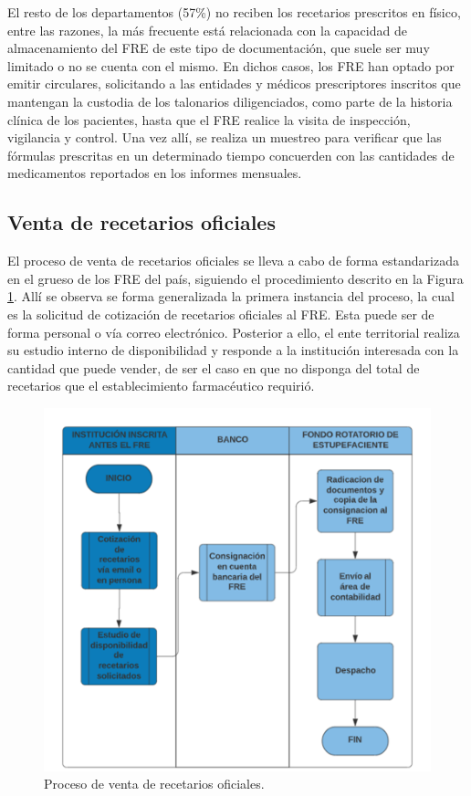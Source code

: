 \documentclass[
  oneside]{book}
\begin{document}
El resto de los departamentos (57\%) no reciben los recetarios prescritos en físico, entre las razones, la más frecuente está relacionada con la capacidad de almacenamiento del FRE de este tipo de documentación, que suele ser muy limitado o no se cuenta con el mismo. En dichos casos, los FRE han optado por emitir circulares, solicitando a las entidades y médicos prescriptores inscritos que mantengan la custodia de los talonarios diligenciados, como parte de la historia clínica de los pacientes, hasta que el FRE realice la visita de inspección, vigilancia y control. Una vez allí, se realiza un muestreo para verificar que las fórmulas prescritas en un determinado tiempo concuerden con las cantidades de medicamentos reportados en los informes mensuales.

\hypertarget{venta-de-recetarios-oficiales}{%
\subsection{Venta de recetarios oficiales}\label{venta-de-recetarios-oficiales}}

El proceso de venta de recetarios oficiales se lleva a cabo de forma estandarizada en el grueso de los FRE del país, siguiendo el procedimiento descrito en la Figura \ref{fig:procesoVentaRec}. Allí se observa se forma generalizada la primera instancia del proceso, la cual es la solicitud de cotización de recetarios oficiales al FRE. Esta puede ser de forma personal o vía correo electrónico. Posterior a ello, el ente territorial realiza su estudio interno de disponibilidad y responde a la institución interesada con la cantidad que puede vender, de ser el caso en que no disponga del total de recetarios que el establecimiento farmacéutico requirió.

\begin{figure}

{\centering \includegraphics[width=0.8\linewidth]{figures/procesoVentaREC} 

}

\caption{Proceso de venta de recetarios oficiales.}\label{fig:procesoVentaRec}
\end{figure}
\end{document}
